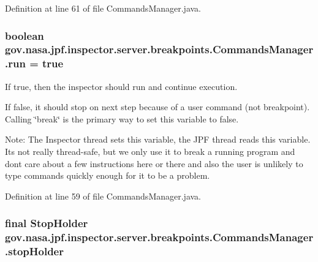 Definition at line 61 of file Commands\+Manager.\+java.

\subsubsection[{\texorpdfstring{run}{run}}]{\setlength{\rightskip}{0pt plus 5cm}boolean gov.\+nasa.\+jpf.\+inspector.\+server.\+breakpoints.\+Commands\+Manager.\+run = true\hspace{0.3cm}{\ttfamily [private]}}\hypertarget{classgov_1_1nasa_1_1jpf_1_1inspector_1_1server_1_1breakpoints_1_1_commands_manager_a1d783904757a3257347e483773ec629a}{}\label{classgov_1_1nasa_1_1jpf_1_1inspector_1_1server_1_1breakpoints_1_1_commands_manager_a1d783904757a3257347e483773ec629a}


If true, then the inspector should run and continue execution. 

If false, it should stop on next step because of a user command (not breakpoint). Calling \char`\"{}break\char`\"{} is the primary way to set this variable to false.

Note\+: The Inspector thread sets this variable, the J\+PF thread reads this variable. It\textquotesingle{}s not really thread-\/safe, but we only use it to break a running program and don\textquotesingle{}t care about a few instructions here or there and also the user is unlikely to type commands quickly enough for it to be a problem. 

Definition at line 59 of file Commands\+Manager.\+java.

\subsubsection[{\texorpdfstring{stop\+Holder}{stopHolder}}]{\setlength{\rightskip}{0pt plus 5cm}final {\bf Stop\+Holder} gov.\+nasa.\+jpf.\+inspector.\+server.\+breakpoints.\+Commands\+Manager.\+stop\+Holder\hspace{0.3cm}{\ttfamily [private]}}\hypertarget{classgov_1_1nasa_1_1jpf_1_1inspector_1_1server_1_1breakpoints_1_1_commands_manager_a3573f950aba2548e59f2c4f7c193b307}{}\label{classgov_1_1nasa_1_1jpf_1_1inspector_1_1server_1_1breakpoints_1_1_commands_manager_a3573f950aba2548e59f2c4f7c193b307}


